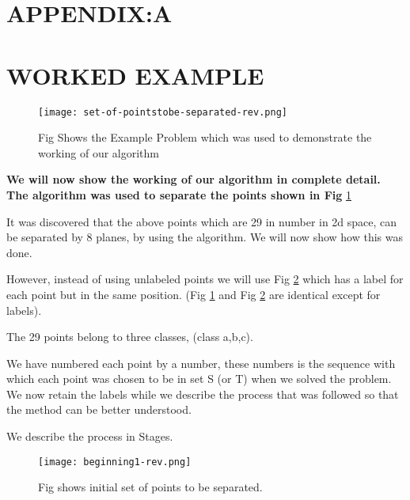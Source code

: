 \documentclass[english]{article}
\begin{document}
\section{APPENDIX:A }


\section*{WORKED EXAMPLE}

\begin{figure}[htp]
 \begin{center}
 \texttt{[image: set-of-pointstobe-separated-rev.png]}

\caption{Fig Shows the Example Problem which was used to demonstrate the working of our algorithm}

\label{fig:fig-b} \end{center}
\end{figure} 

\textbf{We will now show the working of our algorithm in complete
detail. The algorithm was used to separate the points shown in Fig } \ref{fig:fig-b}

It was discovered that the above points which are 29 in number in
2d space, can be separated by 8 planes, by using the algorithm. We
will now show how this was done. 

However, instead of using unlabeled points we will use Fig \ref{fig:fig-c} which
has a label for each point but in the same position. (Fig \ref{fig:fig-b} and Fig
\ref{fig:fig-c} are identical except for labels).

The 29 points belong to three classes, (class a,b,c). 

We have numbered each point by a number, these numbers is the sequence
with which each point was chosen to be in set  S (or T) when we solved
the problem. We now retain the labels while we describe the process
that was followed so that the method can be better understood. 

We describe the process in Stages.

\medskip{}

\begin{figure}[htp]
 \begin{center}
 
\texttt{[image: beginning1-rev.png]}
\caption{Fig shows initial set of points to be separated.}

\label{fig:fig-c} \end{center}
\end{figure} 
\end{document}
